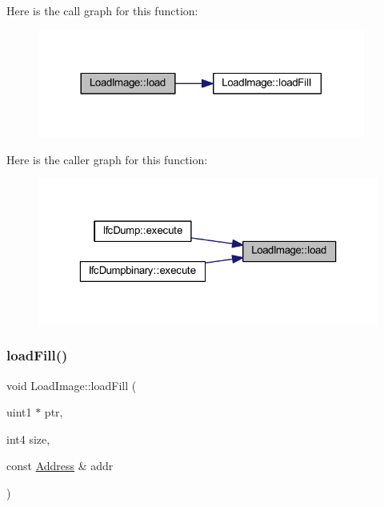 Here is the call graph for this function\+:
\nopagebreak
\begin{figure}[H]
\begin{center}
\leavevmode
\includegraphics[width=305pt]{class_load_image_ae7aee28b81e5629d90bf104954a6835b_cgraph}
\end{center}
\end{figure}
Here is the caller graph for this function\+:
\nopagebreak
\begin{figure}[H]
\begin{center}
\leavevmode
\includegraphics[width=323pt]{class_load_image_ae7aee28b81e5629d90bf104954a6835b_icgraph}
\end{center}
\end{figure}
\mbox{\label{class_load_image_af00d3957284bf0b4721be0ada5ef4328}} 
\subsubsection{\texorpdfstring{loadFill()}{loadFill()}}
{\footnotesize\ttfamily void Load\+Image\+::load\+Fill (\begin{DoxyParamCaption}\item[{uint1 $\ast$}]{ptr,  }\item[{int4}]{size,  }\item[{const \mbox{\hyperlink{class_address}{Address}} \&}]{addr }\end{DoxyParamCaption})\hspace{0.3cm}{\ttfamily [pure virtual]}}



